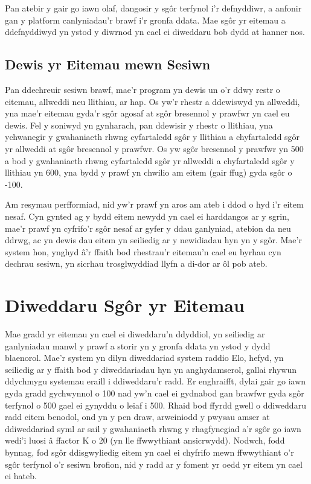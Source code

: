 Pan atebir y gair go iawn olaf, dangosir y sgôr terfynol i'r defnyddiwr, a anfonir gan y platform canlyniadau'r brawf i'r gronfa ddata. Mae sgôr yr eitemau a ddefnyddiwyd yn ystod y diwrnod yn cael ei diweddaru bob dydd at hanner nos.

\subsection{Dewis yr Eitemau mewn Sesiwn}
Pan ddechreuir sesiwn brawf, mae'r program yn dewis un o'r ddwy restr o eitemau, allweddi neu llithiau, ar hap. Os yw'r rhestr a ddewiswyd yn allweddi, yna mae'r eitemau gyda'r sgôr agosaf at sgôr bresennol y prawfwr yn cael eu dewis. Fel y soniwyd yn gynharach, pan ddewisir y rhestr o llithiau, yna ychwanegir y gwahaniaeth rhwng cyfartaledd sgôr y llithiau a chyfartaledd sgôr yr allweddi at sgôr bresennol y prawfwr. Os yw sgôr bresennol y prawfwr yn 500 a bod y gwahaniaeth rhwng cyfartaledd sgôr yr allweddi a chyfartaledd sgôr y llithiau yn 600, yna bydd y prawf yn chwilio am eitem (gair ffug) gyda sgôr o -100.

Am resymau perfformiad, nid yw'r prawf yn aros am ateb i ddod o hyd i'r eitem nesaf. Cyn gynted ag y bydd eitem newydd yn cael ei harddangos ar y sgrin, mae'r prawf yn cyfrifo'r sgôr nesaf ar gyfer y ddau ganlyniad, atebion da neu ddrwg, ac yn dewis dau eitem yn seiliedig ar y newidiadau hyn yn y sgôr. Mae'r system hon, ynghyd â'r ffaith bod rhestrau'r eitemau'n cael eu byrhau cyn dechrau sesiwn, yn sicrhau trosglwyddiad llyfn a di-dor ar ôl pob ateb.

\section{Diweddaru Sgôr yr Eitemau}
Mae gradd yr eitemau yn cael ei diweddaru'n ddyddiol, yn seiliedig ar ganlyniadau manwl y prawf a storir yn y gronfa ddata yn ystod y dydd blaenorol. Mae'r system yn dilyn diweddariad system raddio Elo, hefyd, yn seiliedig ar y ffaith bod y diweddariadau hyn yn anghydamserol, gallai rhywun ddychmygu systemau eraill i ddiweddaru'r radd. Er enghraifft, dylai gair go iawn gyda gradd gychwynnol o 100 nad yw'n cael ei gydnabod gan brawfwr gyda sgôr terfynol o 500 gael ei gynyddu o leiaf i 500. Rhaid bod ffyrdd gwell o ddiweddaru radd eitem benodol, ond yn y pen draw, arweiniodd y pwysau amser at ddiweddariad syml ar sail y gwahaniaeth rhwng y rhagfynegiad a'r sgôr go iawn wedi'i luosi â ffactor K o 20 (yn lle ffwwythiant ansicrwydd). Nodwch, fodd bynnag, fod sgôr ddisgwyliedig eitem yn cael ei chyfrifo mewn ffwwythiant o'r sgôr terfynol o'r sesiwn brofion, nid y radd ar y foment yr oedd yr eitem yn cael ei hateb.

